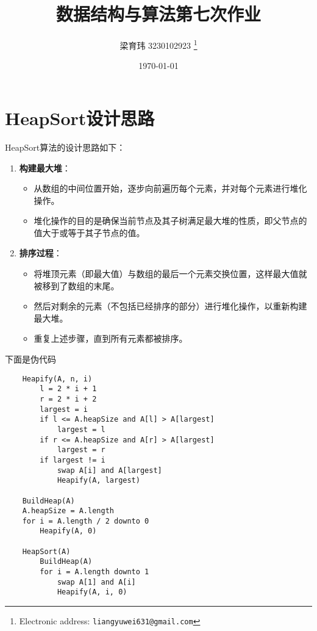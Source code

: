 \documentclass[UTF8]{ctexart}
\begin{document}
\pagestyle{fancy}
\fancyhead{}
\rhead{\today}
\title{数据结构与算法第七次作业}

\author{梁育玮 3230102923
  \thanks{Electronic address: \texttt{liangyuwei631@gmail.com}}}


\date{\today}

\maketitle

\section{HeapSort设计思路}

HeapSort算法的设计思路如下：

\begin{enumerate}
    \item \textbf{构建最大堆}：
    \begin{itemize}
        \item 从数组的中间位置开始，逐步向前遍历每个元素，并对每个元素进行堆化操作。
        \item 堆化操作的目的是确保当前节点及其子树满足最大堆的性质，即父节点的值大于或等于其子节点的值。
    \end{itemize}
    \item \textbf{排序过程}：
    \begin{itemize}
        \item 将堆顶元素（即最大值）与数组的最后一个元素交换位置，这样最大值就被移到了数组的末尾。
        \item 然后对剩余的元素（不包括已经排序的部分）进行堆化操作，以重新构建最大堆。
        \item 重复上述步骤，直到所有元素都被排序。
    \end{itemize}
\end{enumerate}
下面是伪代码

\begin{lstlisting}
    Heapify(A, n, i)
        l = 2 * i + 1
        r = 2 * i + 2
        largest = i
        if l <= A.heapSize and A[l] > A[largest]
            largest = l
        if r <= A.heapSize and A[r] > A[largest]
            largest = r
        if largest != i
            swap A[i] and A[largest]
            Heapify(A, largest)

    BuildHeap(A)
    A.heapSize = A.length
    for i = A.length / 2 downto 0
        Heapify(A, 0)

    HeapSort(A)
        BuildHeap(A)
        for i = A.length downto 1
            swap A[1] and A[i]
            Heapify(A, i, 0)
\end{lstlisting}
\end{document}
